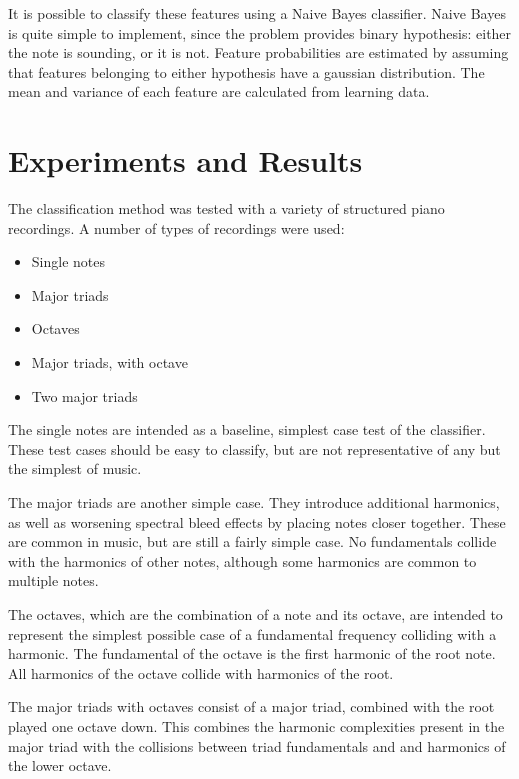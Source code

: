 \documentclass[twocolumn]{article}
\begin{document}
It is possible to classify these features using a Naive Bayes classifier.  Naive Bayes is quite simple to implement, since the problem provides binary hypothesis: either the note is sounding, or it is not.  Feature probabilities are estimated by assuming that features belonging to either hypothesis have a gaussian distribution.  The mean and variance of each feature are calculated from learning data.

\section{Experiments and Results}

The classification method was tested with a variety of structured piano recordings.  A number of types of recordings were used:

\begin{itemize}
 \item Single notes \\
 \item Major triads \\
 \item Octaves \\
 \item Major triads, with octave \\
 \item Two major triads \\
\end{itemize}

The single notes are intended as a baseline, simplest case test of the classifier.  These test cases should be easy to classify, but are not representative of any but the simplest of music.

The major triads are another simple case.  They introduce additional harmonics, as well as worsening spectral bleed effects by placing notes closer together.  These are common in music, but are still a fairly simple case.  No fundamentals collide with the harmonics of other notes, although some harmonics are common to multiple notes.

The octaves, which are the combination of a note and its octave, are intended to represent the simplest possible case of a fundamental frequency colliding with a harmonic.  The fundamental of the octave is the first harmonic of the root note.  All harmonics of the octave collide with harmonics of the root.

The major triads with octaves consist of a major triad, combined with the root played one octave down.  This combines the harmonic complexities present in the major triad with the collisions between triad fundamentals and and harmonics of the lower octave.
\end{document}
